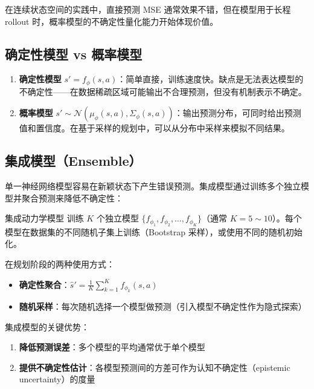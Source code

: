 \begin{remark}
在连续状态空间的实践中，直接预测 MSE 通常效果不错，但在模型用于长程 rollout 时，概率模型的不确定性量化能力开始体现价值。
\end{remark}

\subsection{确定性模型 vs 概率模型}

\begin{enumerate}
    \item \textbf{确定性模型} $s' = f_\phi(s, a)$：简单直接，训练速度快。缺点是无法表达模型的不确定性——在数据稀疏区域可能输出不合理预测，但没有机制表示不确定。
    \item \textbf{概率模型} $s' \sim \mathcal{N}(\mu_\phi(s,a), \Sigma_\phi(s,a))$：输出预测分布，可同时给出预测值和置信度。在基于采样的规划中，可以从分布中采样来模拟不同结果。
\end{enumerate}

\subsection{集成模型（Ensemble）}

单一神经网络模型容易在新颖状态下产生错误预测。集成模型通过训练多个独立模型并聚合预测来降低不确定性：

\begin{mydefinition}{集成动力学模型}
训练 $K$ 个独立模型 $\{f_{\phi_1}, f_{\phi_2}, \dots, f_{\phi_K}\}$（通常 $K = 5 \sim 10$）。每个模型在数据集的不同随机子集上训练（Bootstrap 采样），或使用不同的随机初始化。

在规划阶段的两种使用方式：
\begin{itemize}
    \item \textbf{确定性聚合}：$\hat{s}' = \frac{1}{K} \sum_{k=1}^K f_{\phi_k}(s, a)$
    \item \textbf{随机采样}：每次随机选择一个模型做预测（引入模型不确定性作为隐式探索）
\end{itemize}
\end{mydefinition}

集成模型的关键优势：
\begin{enumerate}
    \item \textbf{降低预测误差}：多个模型的平均通常优于单个模型
    \item \textbf{提供不确定性估计}：各模型预测间的方差可作为认知不确定性（epistemic uncertainty）的度量
\end{enumerate}


